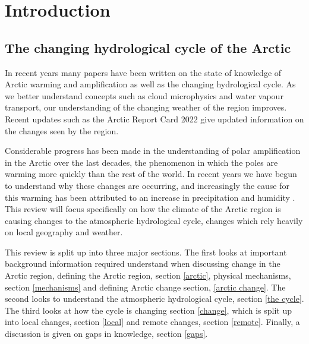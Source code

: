 \documentclass[12pt, oneside]{article}
\begin{document}
\thispagestyle{empty}
\clearpage
\setcounter{page}{1}


\pagebreak







\section{Introduction}
\subsection{The changing hydrological cycle of the Arctic}
In recent years many papers have been written on the state of knowledge of Arctic warming and amplification\cite{davy2018arctic, previdi2021arctic, vihma2016atmospheric, serreze2011processes} as well as the changing hydrological cycle. As we better understand concepts such as cloud microphysics\cite{pithan2014mixed} and water vapour transport\cite{gimeno2019atmospheric}, our understanding of the changing weather of the region improves. Recent updates such as the Arctic Report Card 2022\cite{druckenmiller2022arctic} give updated information on the changes seen by the region.


Considerable progress has been made in the understanding of polar amplification in the Arctic over the last decades, the phenomenon in which the poles are warming more quickly than the rest of the world. In recent years we have begun to understand why these changes are occurring, and increasingly the cause for this warming has been attributed to an increase in precipitation and humidity \cite{dou2022more}. This review will focus specifically on how the climate of the Arctic region is causing changes to the atmospheric hydrological cycle, changes which rely heavily on local geography and weather. 


This review is split up into three major sections. The first looks at important background information required understand when discussing change in the Arctic region, defining the Arctic region, section \ref{arctic}, physical mechanisms, section \ref{mechanisms} and defining Arctic change section, \ref{arctic change}. The second looks to understand the atmospheric hydrological cycle, section \ref{the cycle}. The third looks at how the cycle is changing section \ref{change}, which is split up into local changes, section \ref{local} and remote changes, section \ref{remote}. Finally, a discussion is given on gaps in knowledge, section \ref{gaps}. 
\end{document}
